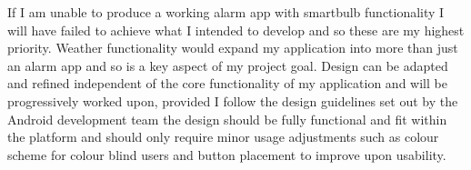 If I am unable to produce a working alarm app with smartbulb
functionality I will have failed to achieve what I intended to develop
and so these are my highest priority. Weather functionality would expand
my application into more than just an alarm app and so is a key aspect
of my project goal. Design can be adapted and refined independent of the
core functionality of my application and will be progressively worked
upon, provided I follow the design guidelines set out by the Android
development team \cite{androiddesign} the design should be fully
functional and fit within the platform and should only require minor
usage adjustments such as colour scheme for colour blind users and
button placement to improve upon usability.

